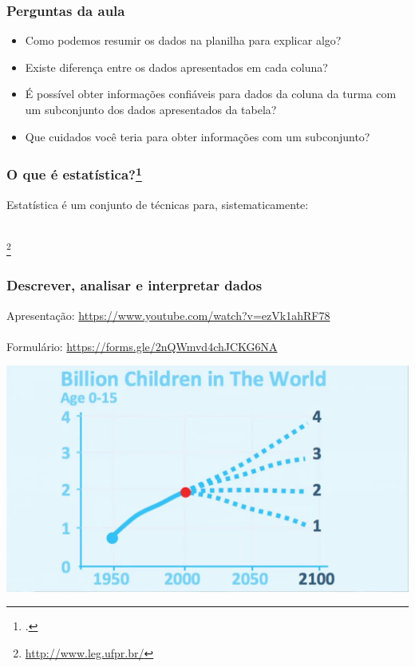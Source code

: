 \documentclass[11pt]{beamer}
\newcommand\blfootnote[1]{%
  \begingroup
  \renewcommand\thefootnote{}\footnote{#1}%
  \addtocounter{footnote}{-1}%
  \endgroup
}
\begin{document}
\begin{frame}
\frametitle{Perguntas da aula}
  \begin{itemize}
  \item Como podemos resumir os dados na planilha para explicar algo?
  \item Existe diferença entre os dados apresentados em cada coluna?
  \item É possível obter informações confiáveis para dados da coluna da turma com um subconjunto dos dados apresentados da tabela?
  \item Que cuidados você teria para obter informações com um subconjunto?
  \end{itemize}
\end{frame}

\begin{frame}
\frametitle{O que é estatística?\footcite{magalhaes2002noccoes}}
Estatística é um conjunto de técnicas para, sistematicamente:
\\~\\
  \begin{itemize}
  \end{itemize}
\blfootnote{\url{http://www.leg.ufpr.br/}}
\end{frame}

\begin{frame}
\frametitle{Descrever, analisar e interpretar dados}

Apresentação: \url{https://www.youtube.com/watch?v=ezVk1ahRF78}\\~\\
Formulário: \url{https://forms.gle/2nQWmvd4chJCKG6NA}

\begin{center}\includegraphics[width=0.9\linewidth]{figs/relegions-and-babies} \end{center}
\end{frame}
\end{document}

